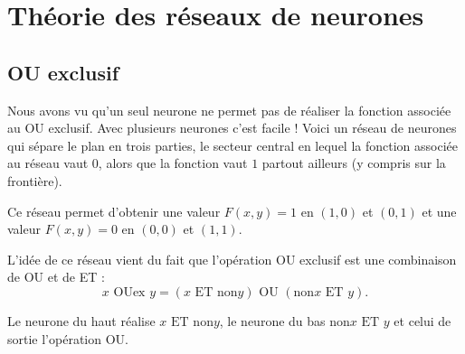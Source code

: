 
\section{Théorie des réseaux de neurones}

\subsection{OU exclusif}

Nous avons vu qu'un seul neurone ne permet pas de réaliser la fonction associée au \og{}OU exclusif\fg{}.
Avec plusieurs neurones c'est facile !
Voici un réseau de neurones qui sépare le plan en trois parties, le secteur central en lequel la fonction associée au réseau vaut $0$, alors que la fonction vaut $1$ partout ailleurs (y compris sur la frontière).




Ce réseau permet d'obtenir une valeur $F(x,y)=1$ en $(1,0)$ et $(0,1)$ et une valeur $F(x,y)=0$ en $(0,0)$ et $(1,1)$.

L'idée de ce réseau vient du fait que l'opération \og{}OU exclusif\fg{} est une combinaison de \og{}OU\fg{} et de \og{}ET\fg{} :
$$x \text{ OUex } y  = (x \text{ ET } \text{non} y) \text{ OU } ( \text{non} x \text{ ET } y).$$


\begin{center}
	\begin{minipage}{0.60\textwidth}
	\end{minipage}
	\begin{minipage}{0.39\textwidth}
	\end{minipage}
\end{center}

Le neurone du haut réalise \og{}$x \text{ ET } \text{non} y$\fg{}, le neurone du bas \og{}$\text{non} x \text{ ET } y$\fg{} et celui de sortie l'opération \og{}OU\fg{}.

